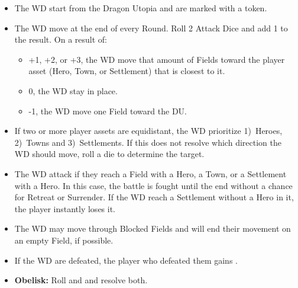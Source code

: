 \begin{multicols}{2}
\begin{itemize}
  \item The WD start from the Dragon Utopia and are marked with a  token.
  \item The WD move at the end of every Round. Roll 2 Attack Dice and add 1 to the result. On a result of:
  \begin{itemize}
    \item +1, +2, or +3, the WD move that amount of Fields toward the player asset (Hero, Town, or Settlement) that is closest to it.
    \item 0, the WD stay in place.
    \item -1, the WD move one Field toward the DU.
  \end {itemize}
  \item If two or more player assets are equidistant, the WD prioritize 1)~Heroes, 2)~Towns and 3)~Settlements.
    If this does not resolve which direction the WD should move, roll a die to determine the target.
  \item The WD attack if they reach a Field with a Hero, a Town, or a Settlement with a Hero.
    In this case, the battle is fought until the end without a chance for Retreat or Surrender.
    If the WD reach a Settlement without a Hero in it, the player instantly loses it.
  \item The WD may move through Blocked Fields and will end their movement on an empty Field, if possible.
  \item If the WD are defeated, the player who defeated them gains .
  \item \textbf{Obelisk:} Roll  and  and resolve both.
\end{itemize}
\end{multicols}

